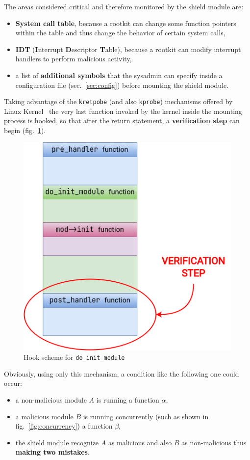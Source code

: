 \documentclass{article}
\begin{document}
	The areas considered critical and therefore monitored by the shield module are:
	\begin{itemize}
		\item \textbf{System call table}, because a rootkit can change some function pointers within the table
		and thus change the behavior of certain system calls,
		\item \textbf{IDT} (\textbf{I}nterrupt \textbf{D}escriptor \textbf{T}able), because a rootkit can modify
		interrupt handlers to perform malicious activity,
		\item a list of \textbf{additional symbols} that the sysadmin can specify inside a configuration file
		(sec.~\ref{sec:config}) before mounting the shield module.
	\end{itemize}

	Taking advantage of the \texttt{kretpobe} (and also \texttt{kprobe}) mechanisms offered by Linux
	Kernel~\cite{doc:kprobe} the very last function invoked by the kernel inside the mounting process
	is hooked, so that after the return statement, a \textbf{verification step} can begin
	(fig.~\ref{fig:monitoring}).

	\begin{figure}[!htbp]
		\centering
		\includegraphics[scale=0.4]{monitoring}
		\caption{Hook scheme for \texttt{do\_init\_module}}
		\label{fig:monitoring}
	\end{figure}

	Obviously, using only this mechanism, a condition like the following one could occur:
	\begin{itemize}
		\item a non-malicious module $A$ is running a function $\alpha$,
		\item a malicious module $B$ is running \ul{concurrently} (such as shown in fig.~\ref{fig:concurrency}) a
		function $\beta$,
		\item the shield module recognize $A$ as malicious \ul{and also $B$ as non-malicious} thus \textbf{making two mistakes}.
	\end{itemize}
\end{document}
